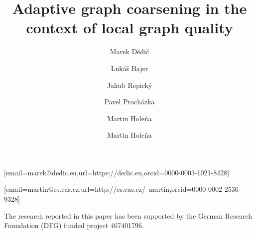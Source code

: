 





\title{Adaptive graph coarsening in the context of local graph quality}
\author[1,2]{Marek Dědič}[email=marek@dedic.eu,url=https://dedic.eu,orcid=0000-0003-1021-8428]
\cormark[1]
\author[2]{Lukáš Bajer}
\author[2]{Jakub Repický}
\author[2]{Pavel Procházka}
\author[3]{Martin Holeňa}
\author[3]{Martin Holeňa}[email=martin@cs.cas.cz,url=http://cs.cas.cz/~martin,orcid=0000-0002-2536-9328]

\address[1]{Czech Technical University in Prague, Břehová 7, Prague, Czech Republic}
\address[2]{Cisco Systems, Inc., Karlovo náměstı́ 10, Prague, Czech Republic}
\address[3]{Institute of Computer Science, Czech Academy of Sciences, Pod vodárenskou věží 2, Prague, Czech Republic}




\maketitle








\begin{acknowledgments}
  The research reported in this paper has been supported by the German Research Foundation (DFG) funded project 467401796.
\end{acknowledgments}




